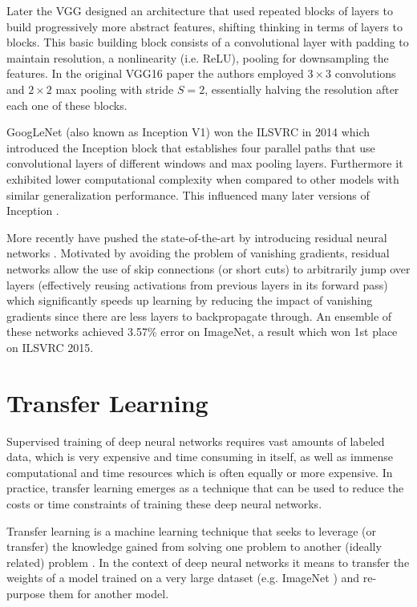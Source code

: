 Later the \ac{VGG} designed an architecture that used repeated blocks of layers to build progressively more abstract features, shifting thinking in terms of layers to blocks. This basic building block consists of a convolutional layer with padding to maintain resolution, a nonlinearity (i.e. ReLU), pooling for downsampling the features. In the original VGG16 paper \cite{vgg16} the authors employed $3 \times 3$ convolutions and $2 \times 2$ max pooling with stride $S = 2$, essentially halving the resolution after each one of these blocks.

GoogLeNet \cite{inceptionv1} (also known as Inception V1) won the \ac{ILSVRC} \cite{imagenet} in 2014 which introduced the Inception block that establishes four parallel paths that use convolutional layers of different windows and max pooling layers. Furthermore it exhibited lower computational complexity when compared to other models with similar generalization performance. This influenced many later versions of Inception \cite{inceptionv2_3}\cite{inceptionv4}.

More recently \citeauthor{resnet} have pushed the state-of-the-art by introducing residual neural networks \cite{resnet}. Motivated by avoiding the problem of vanishing gradients, residual networks allow the use of skip connections (or short cuts) to arbitrarily jump over layers (effectively reusing activations from previous layers in its forward pass) which significantly speeds up learning by reducing the impact of vanishing gradients since there are less layers to backpropagate through. An ensemble of these networks achieved 3.57\% error on ImageNet, a result which won 1st place on \ac{ILSVRC} 2015.

\section{Transfer Learning}
\label{section:transferlearning}

Supervised training of deep neural networks requires vast amounts of labeled data, which is very expensive and time consuming in itself, as well as immense computational and time resources which is often equally or more expensive. In practice, transfer learning emerges as a technique that can be used to reduce the costs or time constraints of training these deep neural networks.

Transfer learning is a machine learning technique that seeks to leverage (or transfer) the knowledge gained from solving one problem to another (ideally related) problem \cite{deeptransferlearning}. In the context of deep neural networks it means to transfer the weights of a model trained on a very large dataset (e.g. ImageNet \cite{imagenet}) and re-purpose them for another model.

